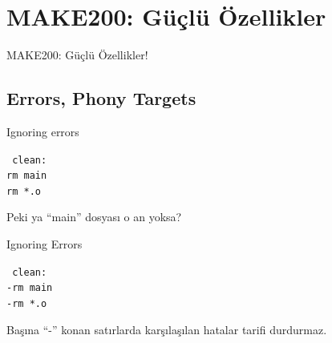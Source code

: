 \documentclass{beamer}
\begin{document}
\section{MAKE200: Güçlü Özellikler}
{
\begin{frame}
    {MAKE200: Güçlü Özellikler!}
\end{frame}
}

\subsection{Errors, Phony Targets}
\begin{frame}
    {Ignoring errors}

\texttt{%
        clean:\\
        \hspace{10mm}   rm main\\
        \hspace{10mm}   rm *.o\\}

        \vspace{5mm}

        Peki ya ``main'' dosyası o an yoksa?

\end{frame}

\begin{frame}
    {Ignoring Errors}

\texttt{%
        clean:\\
        \hspace{10mm}   -rm main\\
        \hspace{10mm}   -rm *.o\\}

        \vspace{5mm}

        Başına ``-'' konan satırlarda karşılaşılan hatalar tarifi durdurmaz.

\end{frame}
\end{document}
